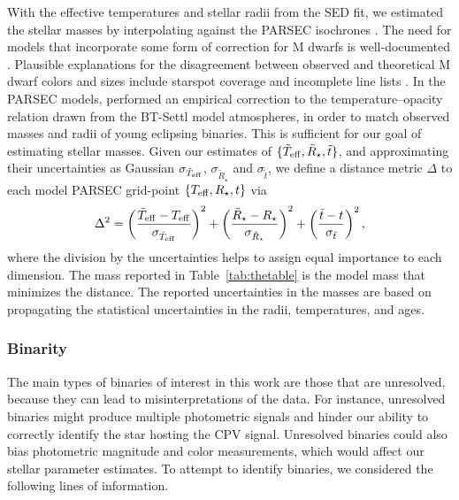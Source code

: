 \documentclass[11pt,twocolumn,tighten]{aastex63}
\begin{document}
With the effective temperatures and stellar radii from the SED fit, we
estimated the stellar masses by interpolating against the PARSEC
isochrones \citep[v1.2S;][]{2014MNRAS.444.2525C}.  The need for models
that incorporate some form of correction for M dwarfs is
well-documented \citep[e.g.][]{2012ApJ...757..112B,2012ApJ...756...47S,2015ApJ...804..146D,2016A&A...593A..99F,2018AJ....155..225K,2019MNRAS.489.2615M,2020ApJ...891...29S}.
Plausible explanations for the disagreement between observed and
theoretical M dwarf colors and sizes include starspot coverage
\citep[e.g.][]{2017ApJ...836..200G} and incomplete line
lists \citep[e.g.][]{2013A&A...556A..15R}.  In the PARSEC models,
\citet{2014MNRAS.444.2525C} performed an empirical correction to the
temperature--opacity relation drawn from the BT-Settl model
atmospheres, in order to match observed masses and radii of young
eclipsing binaries.  This is sufficient for our goal of estimating
stellar masses.  Given our estimates of $\{ \tilde{T}_{\rm eff},
\tilde{R}_\star, \tilde{t} \}$, and approximating their uncertainties
as Gaussian $\sigma_{\tilde{T}_{\rm eff}}$, $\sigma_{\tilde{R}_\star}$
and $\sigma_{\tilde{t}}$, we define a distance metric $\Delta$ to each
model PARSEC grid-point $\{ T_{\rm eff}, R_\star, t \}$ via
\begin{equation}
  \Delta^2 = 
  \left( \frac{\tilde{T}_{\rm eff} - T_{\rm eff}}{\sigma_{\tilde{T}_{\rm eff}}} \right)^2
  +
  \left( \frac{\tilde{R}_{\star} - R_{\star}}{\sigma_{\tilde{R}_{\star}}} \right)^2
  +
  \left( \frac{\tilde{t} - t}{\sigma_{\tilde{t}}} \right)^2,
\end{equation}
where the division by the uncertainties helps to assign equal
importance to each dimension.  The mass reported in
Table~\ref{tab:thetable} is the model mass that minimizes the
distance.  The reported uncertainties in the masses are based on
propagating the statistical uncertainties in the radii, temperatures,
and ages.


\subsubsection{Binarity}

The main types of binaries of interest in this work are those that are
unresolved, because they can lead to misinterpretations of the data.
For instance, unresolved binaries might produce multiple photometric
signals and hinder our ability to correctly identify the star hosting
the CPV signal.  Unresolved binaries could also bias photometric
magnitude and color measurements, which would affect our stellar
parameter estimates.  To attempt to identify binaries, we considered
the following lines of information.
\end{document}
